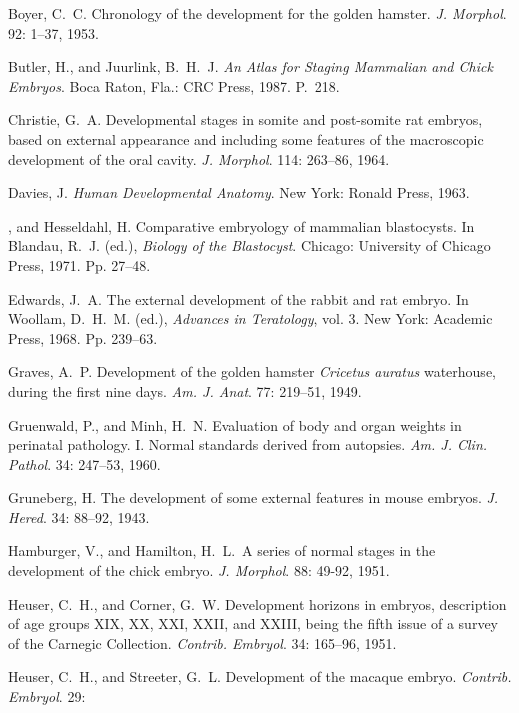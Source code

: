 \enlargethispage*{1pc}
\vspace*{-1pc}
\begin{numreferences}
\item Boyer, C.~C. Chronology of the development for the golden
hamster. {\it J. Morphol}. 92: 1--37, 1953.

\item Butler, H., and Juurlink, B.~H.~J.
{\it An Atlas for Staging Mammalian and Chick Embryos}. 
Boca Raton, Fla.: CRC Press, 1987. P.~218.

\item Christie, G.~A. Developmental stages in somite and post-somite
rat embryos, based on external appearance and including some
features of the macroscopic development of the oral cavity.
{\it J. Morphol}. 114: 263--86, 1964.
\item Davies, J. {\it Human Developmental Anat\-o\-my}. New York:
Ronald Press, 1963.
\item {}, and Hesseldahl, H. Comparative embryology of
mammalian blastocysts. In Blandau,
R.~J. (ed.), {\it Biology of the Blastocyst}. Chicago:
University of Chicago Press, 1971. Pp. 27--48.
\item  Edwards, J.~A. The external development of the rabbit and rat embryo.
In Woollam, D.~H.~M.
(ed.), {\it Advances in Teratology}, vol. 3. New York:
Academic Press, 1968. Pp. 239--63.
\item  Graves, A.~P. Development of the golden hamster
{\it Cricetus auratus} waterhouse, during the
  first nine days. {\it Am. J. Anat}. 77: 219--51, 1949.
\item  Gruenwald, P., and Minh, H.~N. Evaluation of body and organ
weights in perinatal pathology. I.
    Normal standards derived from autopsies.
{\it Am. J. Clin. Pathol}. 34: 247--53, 1960.
\item  Gruneberg, H. The development of some external features in
mouse embryos. {\it J. Hered}. 34:
    88--92, 1943.
\item Hamburger, V., and Hamilton, H.~L.~A series of normal stages in
the development of the chick
embryo. {\it J. Morphol}. 88: 49-92, 1951.
\item Heuser, C.~H., and Corner, G.~W. Development horizons in embryos,
description of age groups
XIX, XX, XXI, XXII, and XXIII, being the fifth issue of a survey of 
the Carnegic Collection. {\it Contrib. Embryol}. 34: 165--96, 1951.
\item Heuser, C.~H., and Streeter, G.~L. Development of the macaque embryo.
{\it Contrib. Embryol}. 29:

\end{numreferences}
